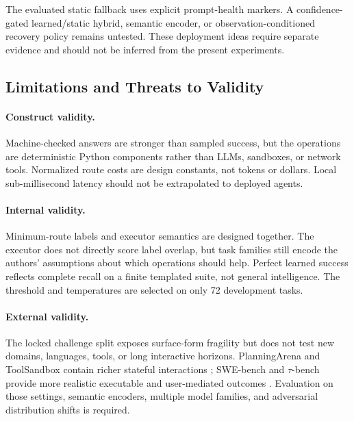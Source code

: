 \documentclass[letterpaper]{article} %
\begin{document}
The evaluated static fallback uses explicit prompt-health markers. A confidence-gated learned/static hybrid, semantic encoder, or observation-conditioned recovery policy remains untested. These deployment ideas require separate evidence and should not be inferred from the present experiments.

\subsection{Limitations and Threats to Validity}

\paragraph{Construct validity.}
Machine-checked answers are stronger than sampled success, but the operations are deterministic Python components rather than LLMs, sandboxes, or network tools. Normalized route costs are design constants, not tokens or dollars. Local sub-millisecond latency should not be extrapolated to deployed agents.

\paragraph{Internal validity.}
Minimum-route labels and executor semantics are designed together. The executor does not directly score label overlap, but task families still encode the authors' assumptions about which operations should help. Perfect learned success reflects complete recall on a finite templated suite, not general intelligence. The threshold and temperatures are selected on only 72 development tasks.

\paragraph{External validity.}
The locked challenge split exposes surface-form fragility but does not test new domains, languages, tools, or long interactive horizons. PlanningArena and ToolSandbox contain richer stateful interactions \citep{zheng2025planningarena,lu2025toolsandbox}; SWE-bench and $\tau$-bench provide more realistic executable and user-mediated outcomes \citep{jimenez2024swebench,yao2024taubench}. Evaluation on those settings, semantic encoders, multiple model families, and adversarial distribution shifts is required.
\end{document}
